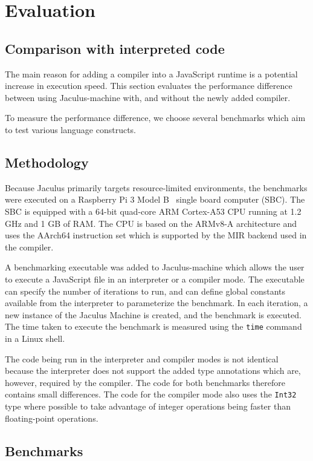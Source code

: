 \chapter{Evaluation}

\section{Comparison with interpreted code}

The main reason for adding a compiler into a JavaScript runtime is a potential increase in execution speed. This section evaluates the performance difference between using Jaculus-machine with, and without the newly added compiler.

To measure the performance difference, we choose several benchmarks which aim to test various language constructs.

\section{Methodology}

Because Jaculus primarily targets resource-limited environments, the benchmarks were executed on a Raspberry Pi 3 Model B~\cite{rpi3b_product} single board computer (SBC). The SBC is equipped with a 64-bit quad-core ARM Cortex-A53 CPU running at 1.2 GHz and 1 GB of RAM. The CPU is based on the ARMv8-A architecture and uses the AArch64 instruction set which is supported by the MIR backend used in the compiler.

A benchmarking executable was added to Jaculus-machine which allows the user to execute a JavaScript file in an interpreter or a compiler mode. The executable can specify the number of iterations to run, and can define global constants available from the interpreter to parameterize the benchmark. In each iteration, a new instance of the Jaculus Machine is created, and the benchmark is executed. The time taken to execute the benchmark is measured using the \texttt{time} command in a Linux shell.

The code being run in the interpreter and compiler modes is not identical because the interpreter does not support the added type annotations which are, however, required by the compiler. The code for both benchmarks therefore contains small differences. The code for the compiler mode also uses the \texttt{Int32} type where possible to take advantage of integer operations being faster than floating-point operations.


\section{Benchmarks}


